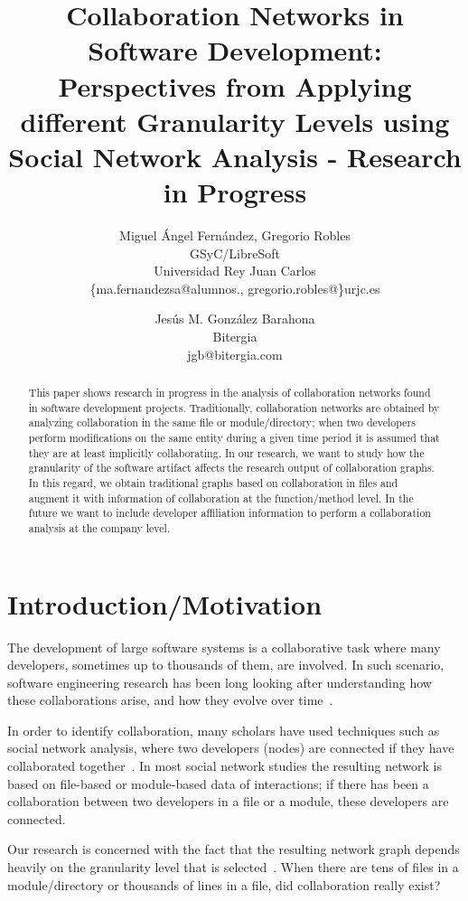 \documentclass[a4paper]{article}
\title{Collaboration Networks in Software Development: Perspectives from Applying different Granularity Levels using Social Network Analysis - Research in Progress}
\author{
Miguel Ángel Fernández, Gregorio Robles \\ GSyC/LibreSoft \\
                Universidad Rey Juan Carlos \\ \{ma.fernandezsa@alumnos., gregorio.robles@\}urjc.es
\and
Jesús M. González Barahona \\ Bitergia \\
                jgb@bitergia.com
}
\begin{document}
\maketitle

\begin{abstract}
This paper shows research in progress in the analysis of collaboration networks
found in software development projects. Traditionally, collaboration networks
are obtained by analyzing collaboration in the same file or module/directory;
when two developers perform modifications on the same entity during a given time
period it is assumed that they are at least implicitly collaborating. In our 
research, we want to study how the granularity of the software artifact affects
the research output of collaboration graphs. In this regard, we obtain traditional
graphs based on collaboration in files and augment it with information of
collaboration at the function/method level. In the future we want to include
developer affiliation information to perform a collaboration analysis at the
company level.
\end{abstract}
\vskip 32pt


\section{Introduction/Motivation}

The development of large software systems is a collaborative task where
many developers, sometimes up to thousands of them, are involved. In such 
scenario, software engineering research has been long looking after
understanding how these collaborations arise, and how they evolve over time~\cite{minto2007recommending,singh2010small,surian2010mining,hossain2009social}.

In order to identify collaboration, many scholars have used techniques such as
social network analysis, where two developers (nodes) are connected if they
have collaborated together~\cite{madey2002open,lopez2004applying}. In most social network studies the
resulting network is based on file-based or module-based data of interactions;
if there has been a collaboration between two developers in a file or a module,
these developers are connected. 

Our research is concerned with the fact that the resulting network graph depends
heavily on the granularity level that is selected~\cite{howison2012validity}. When there are tens of files
in a module/directory or thousands of lines in a file, did collaboration really
exist?
\end{document}
